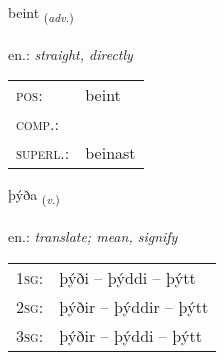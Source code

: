 \documentclass[frontgrid, backgrid]{flacards}\usepackage[]{graphicx}\usepackage[]{xcolor}
\begin{document}
\renewcommand{\blhead}{\vskip5pt {\small\bfseries\footnotesize Atviksorð | Adverb }}
\renewcommand{\bcfoot}{\vskip5pt \hspace{2pt}{\small\bfseries\footnotesize 1K}}


{beint \small{\textsubscript{(\textit{adv.})}} \\[1ex] %
\textphonetic{[pein̥t]} \\
en.: \emph{straight, directly} \\  [2ex]
\renewcommand*{\arraystretch}{0.8}
\begin{tabular}{ll}
\textsc{pos}: & beint \\ 
\textsc{comp.}: &  \\ 
\textsc{superl.}: & beinast \\
\end{tabular}
}

\renewcommand{\flhead}{\vskip5pt \fboxsep=0pt {\small\bfseries\footnotesize Sagnorð | Verb}}
\renewcommand{\fcfoot}{\vskip5pt \fboxsep=0pt \hspace{2pt}{\small\bfseries\footnotesize 1K}}

\renewcommand{\blhead}{\vskip5pt {\small\bfseries\footnotesize Sagnorð | Verb }}
\renewcommand{\bcfoot}{\vskip5pt \hspace{2pt}{\small\bfseries\footnotesize 1K}}


{þýða \small{\textsubscript{(\textit{v.})}} \\[1ex] %
\textphonetic{[θiːða]} \\
en.: \emph{translate; mean, signify} \\  [2ex]
\renewcommand*{\arraystretch}{0.8}
\begin{tabular}{p{1cm}l}
\textsc{1sg}: & þýði -- þýddi -- þýtt \\ 
\textsc{2sg}: & þýðir -- þýddir -- þýtt \\ 
\textsc{3sg}: & þýðir -- þýddi -- þýtt \\ 
\end{tabular}
}

\renewcommand{\flhead}{\vskip5pt \fboxsep=0pt {\small\bfseries\footnotesize Sagnorð | Verb}}
\renewcommand{\fcfoot}{\vskip5pt \fboxsep=0pt \hspace{2pt}{\small\bfseries\footnotesize 1K}}
\end{document}
